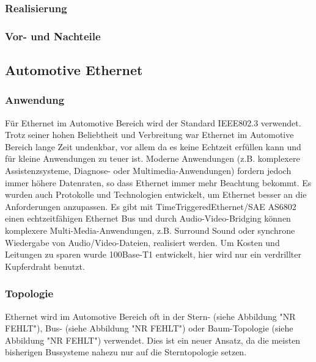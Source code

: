 \subsubsection{Realisierung}
\subsubsection{Vor- und Nachteile}

\subsection{Automotive Ethernet}
\subsubsection{Anwendung}
Für Ethernet im Automotive Bereich wird der Standard IEEE802.3 verwendet. Trotz seiner hohen Beliebtheit und Verbreitung war Ethernet im Automotive Bereich lange Zeit undenkbar, vor allem da es keine Echtzeit erfüllen kann und für kleine Anwendungen zu teuer ist. Moderne Anwendungen (z.B. komplexere Assistenzsysteme, Diagnose- oder Multimedia-Anwendungen) fordern jedoch immer höhere Datenraten, so dass Ethernet immer mehr Beachtung bekommt. Es wurden auch Protokolle und Technologien entwickelt, um Ethernet besser an die Anforderungen anzupassen. Es gibt mit TimeTriggeredEthernet/SAE AS6802 einen echtzeitfähigen Ethernet Bus und durch Audio-Video-Bridging können komplexere Multi-Media-Anwendungen, z.B. Surround Sound oder synchrone Wiedergabe von Audio/Video-Dateien, realisiert werden. Um Kosten und Leitungen zu sparen wurde 100Base-T1 entwickelt, hier wird nur ein verdrillter Kupferdraht benutzt.


\subsubsection{Topologie}
Ethernet wird im Automotive Bereich oft in der Stern- (siehe Abbildung "NR FEHLT"), Bus- (siehe Abbildung "NR FEHLT") oder Baum-Topologie (siehe Abbildung "NR FEHLT") verwendet. Dies ist ein neuer Ansatz, da die meisten bisherigen Bussysteme nahezu nur auf die Sterntopologie setzen.

